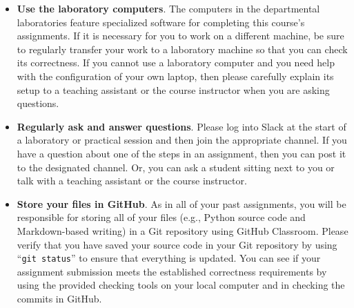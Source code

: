 \documentclass[11pt]{article}
\newcommand{\command}[1]{``\lstinline{#1}''}
\begin{document}
\begin{itemize}
  \setlength{\itemsep}{0pt}

\item {\bf Use the laboratory computers}. The computers in the departmental
  laboratories feature specialized software for completing this course's
  assignments. If it is necessary for you to work on a different machine, be
  sure to regularly transfer your work to a laboratory machine so that you can
  check its correctness. If you cannot use a laboratory computer and you need
  help with the configuration of your own laptop, then please carefully explain
  its setup to a teaching assistant or the course instructor when you are asking
  questions.

\item {\bf Regularly ask and answer questions}. Please log into Slack at the
  start of a laboratory or practical session and then join the appropriate
  channel. If you have a question about one of the steps in an assignment, then
  you can post it to the designated channel. Or, you can ask a student sitting
  next to you or talk with a teaching assistant or the course instructor.

\item {\bf Store your files in GitHub}. As in all of your past assignments, you
  will be responsible for storing all of your files (e.g., Python source code and
  Markdown-based writing) in a Git repository using GitHub Classroom. Please
  verify that you have saved your source code in your Git repository by using
  \command{git status} to ensure that everything is updated. You can see if
  your assignment submission meets the established correctness requirements by
  using the provided checking tools on your local computer and in checking the
  commits in GitHub.




\end{itemize}
\end{document}

